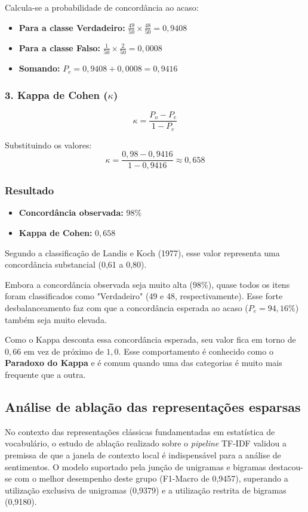 \documentclass{IEEEtran}
\begin{document}
Calcula-se a probabilidade de concordância ao acaso:
\begin{itemize}
    \item \textbf{Para a classe Verdadeiro:} $\frac{49}{50} \times \frac{48}{50} = 0{,}9408$
    \item \textbf{Para a classe Falso:} $\frac{1}{50} \times \frac{2}{50} = 0{,}0008$
    \item \textbf{Somando:} $P_e = 0{,}9408 + 0{,}0008 = 0{,}9416$
\end{itemize}

\subsubsection*{3. Kappa de Cohen ($\kappa$)}

$$\kappa = \frac{P_o - P_e}{1 - P_e}$$

Substituindo os valores:
$$\kappa = \frac{0{,}98 - 0{,}9416}{1 - 0{,}9416} \approx 0{,}658$$

\subsubsection*{Resultado}
\begin{itemize}
    \item \textbf{Concordância observada:} $98\%$
    \item \textbf{Kappa de Cohen:} $0{,}658$
\end{itemize}

Segundo a classificação de Landis e Koch (1977), esse valor representa uma concordância substancial (0,61 a 0,80).

Embora a concordância observada seja muito alta ($98\%$), quase todos os itens foram classificados como "Verdadeiro" (49 e 48, respectivamente). Esse forte desbalanceamento faz com que a concordância esperada ao acaso ($P_e = 94{,}16\%$) também seja muito elevada. 

Como o Kappa desconta essa concordância esperada, seu valor fica em torno de $0{,}66$ em vez de próximo de $1{,}0$. Esse comportamento é conhecido como o \textbf{Paradoxo do Kappa} e é comum quando uma das categorias é muito mais frequente que a outra.

\subsection{Análise de ablação das representações esparsas}

No contexto das representações clássicas fundamentadas em estatística de vocabulário, o estudo de ablação realizado sobre o \textit{pipeline} TF-IDF validou a premissa de que a janela de contexto local é indispensável para a análise de sentimentos. O modelo suportado pela junção de unigramas e bigramas destacou-se com o melhor desempenho deste grupo (F1-Macro de 0,9457), superando a utilização exclusiva de unigramas (0,9379) e a utilização restrita de bigramas (0,9180).
\end{document}
